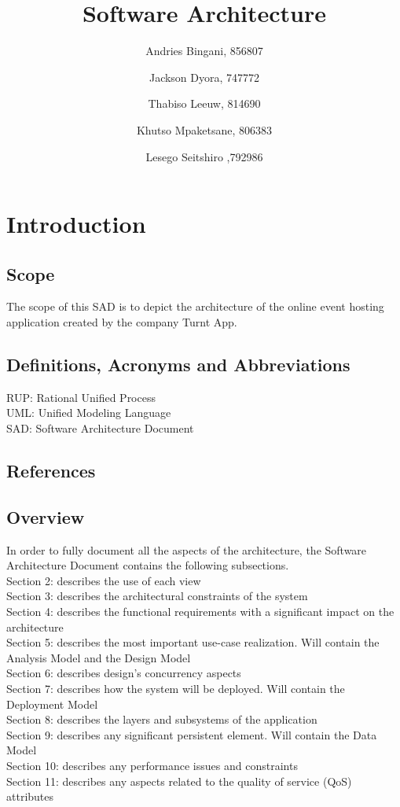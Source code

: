 \documentclass[10pt,a4paper]{article}
\author{
  Andries Bingani, 856807 \and
  Jackson Dyora, 747772\and
  Thabiso Leeuw, 814690 \and
  Khutso Mpaketsane, 806383 \and
  Lesego Seitshiro ,792986
}
\title{Software Architecture}
\begin{document}
\maketitle
\section{Introduction}
\subsection{Scope}
The scope of this SAD is to depict the architecture of the online event hosting application created by the company Turnt App.

\subsection{Definitions, Acronyms and Abbreviations}	
RUP: Rational Unified Process\\
UML: Unified Modeling Language\\
SAD: Software Architecture Document\\

\subsection{References}
\subsection{Overview}
In order to fully document all the aspects of the architecture, the Software Architecture Document contains the following subsections.\\
Section 2: describes the use of each view\\
Section 3: describes the architectural constraints of the system\\
Section 4: describes the functional requirements with a significant impact on the architecture\\
Section 5: describes the most important use-case realization. Will contain the Analysis Model and the Design Model\\
Section 6: describes design’s concurrency aspects\\
Section 7: describes how the system will be deployed. Will contain the Deployment Model\\
Section 8: describes the layers and subsystems of the application\\
Section 9: describes any significant persistent element. Will contain the Data Model\\
Section 10: describes any performance issues and constraints\\
Section 11: describes any aspects related to the quality of service (QoS) attributes\\
\end{document}
